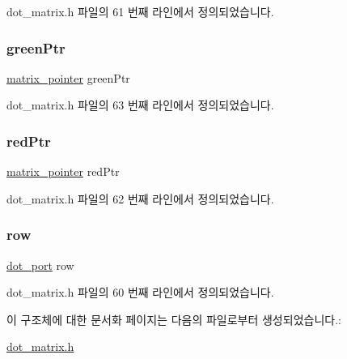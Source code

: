 dot\+\_\+matrix.\+h 파일의 61 번째 라인에서 정의되었습니다.

\mbox{\label{struct__dot__matrix_ae24a27965d4b51bdc8068bc7a445ed68}} 
\subsubsection{\texorpdfstring{green\+Ptr}{greenPtr}}
{\footnotesize\ttfamily \hyperlink{dot__matrix_8h_a5e6e638164edbbc5442305b37227e062}{matrix\+\_\+pointer} green\+Ptr}



dot\+\_\+matrix.\+h 파일의 63 번째 라인에서 정의되었습니다.

\mbox{\label{struct__dot__matrix_a1a5469905d186f7dd9479561eb9ae6e2}} 
\subsubsection{\texorpdfstring{red\+Ptr}{redPtr}}
{\footnotesize\ttfamily \hyperlink{dot__matrix_8h_a5e6e638164edbbc5442305b37227e062}{matrix\+\_\+pointer} red\+Ptr}



dot\+\_\+matrix.\+h 파일의 62 번째 라인에서 정의되었습니다.

\mbox{\label{struct__dot__matrix_a549cd7f99fcdc1c15298e7a72ed1833e}} 
\subsubsection{\texorpdfstring{row}{row}}
{\footnotesize\ttfamily \hyperlink{dot__matrix_8h_a03f53cc8acae29f160b6cc647fa3db16}{dot\+\_\+port} row}



dot\+\_\+matrix.\+h 파일의 60 번째 라인에서 정의되었습니다.



이 구조체에 대한 문서화 페이지는 다음의 파일로부터 생성되었습니다.\+:\begin{DoxyCompactItemize}
\item 
\hyperlink{dot__matrix_8h}{dot\+\_\+matrix.\+h}\end{DoxyCompactItemize}
